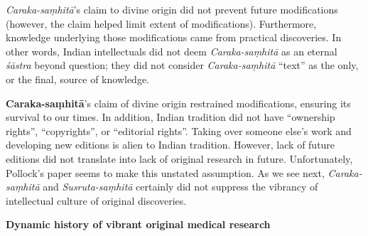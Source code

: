 {\sl Caraka-saṃhitā}'s claim to divine origin did not prevent future modifications (however, the claim helped limit extent of modifications).  Furthermore, knowledge underlying those modifications came from practical discoveries.  In other words, Indian intellectuals did not deem {\sl Caraka-saṃhitā} as an eternal {\sl śāstra} beyond question; they did not consider {\sl Caraka-saṃhitā} ``text'' as the only, or the final, source of knowledge.

{\bf Caraka-saṃhitā}'s claim of divine origin restrained modifications, ensuring its survival to our times. In addition, Indian tradition did not have ``ownership rights'', ``copyrights'', or ``editorial rights''.  Taking over someone else's work and developing new editions is alien to Indian tradition.  However, lack of future editions did not translate into lack of original research in future.  Unfortunately, Pollock's paper seems to make this unstated assumption. As we see next, {\sl Caraka-saṃhitā} and {\sl Susruta-saṃhitā} certainly did not suppress the vibrancy of intellectual culture of original discoveries.

{\bf Dynamic history of vibrant original medical research}

